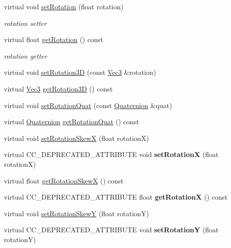 \begin{Indent}
\begin{DoxyCompactItemize}
virtual void \hyperlink{classNode_a62dda439f77712f0d9b405ce887df676}{set\+Rotation} (float rotation)
\begin{DoxyCompactList}\small\item\em rotation setter \end{DoxyCompactList}\item 
virtual float \hyperlink{classNode_aca7139bc3ea6705d41bb65a4fb7ddb6c}{get\+Rotation} () const
\begin{DoxyCompactList}\small\item\em rotation getter \end{DoxyCompactList}\item 
virtual void \hyperlink{classNode_a2ce988bebd6c8b804d8bfdfafd511c40}{set\+Rotation3D} (const \hyperlink{classVec3}{Vec3} \&rotation)
\item 
virtual \hyperlink{classVec3}{Vec3} \hyperlink{classNode_aeabcf9427f303b0adf32bb7513706e2c}{get\+Rotation3D} () const
\item 
virtual void \hyperlink{classNode_a59c0b9e9afc4668320d90c340e5727e7}{set\+Rotation\+Quat} (const \hyperlink{classQuaternion}{Quaternion} \&quat)
\item 
virtual \hyperlink{classQuaternion}{Quaternion} \hyperlink{classNode_ad5beb5903cd9dc3258b513e742d1a0d0}{get\+Rotation\+Quat} () const
\item 
virtual void \hyperlink{classNode_a66a533225994dbfe125c3421df4cbb38}{set\+Rotation\+SkewX} (float rotationX)
\item 
\mbox{\label{classNode_ad1bd25ac980529f8a410523a42ab6e2a}} 
virtual C\+C\+\_\+\+D\+E\+P\+R\+E\+C\+A\+T\+E\+D\+\_\+\+A\+T\+T\+R\+I\+B\+U\+TE void {\bfseries set\+RotationX} (float rotationX)
\item 
virtual float \hyperlink{classNode_a2e23faa37bc1d55b7c4b6cba94a62fce}{get\+Rotation\+SkewX} () const
\item 
\mbox{\label{classNode_aac0fe1e486b4d0bbbc7e2a4203865285}} 
virtual C\+C\+\_\+\+D\+E\+P\+R\+E\+C\+A\+T\+E\+D\+\_\+\+A\+T\+T\+R\+I\+B\+U\+TE float {\bfseries get\+RotationX} () const
\item 
virtual void \hyperlink{classNode_a901c5fbd2327fbd6fd14771fd45d71af}{set\+Rotation\+SkewY} (float rotationY)
\item 
\mbox{\label{classNode_a66f99fb391706801bd5c162654a8786c}} 
virtual C\+C\+\_\+\+D\+E\+P\+R\+E\+C\+A\+T\+E\+D\+\_\+\+A\+T\+T\+R\+I\+B\+U\+TE void {\bfseries set\+RotationY} (float rotationY)

\end{DoxyCompactItemize}
\end{Indent}
